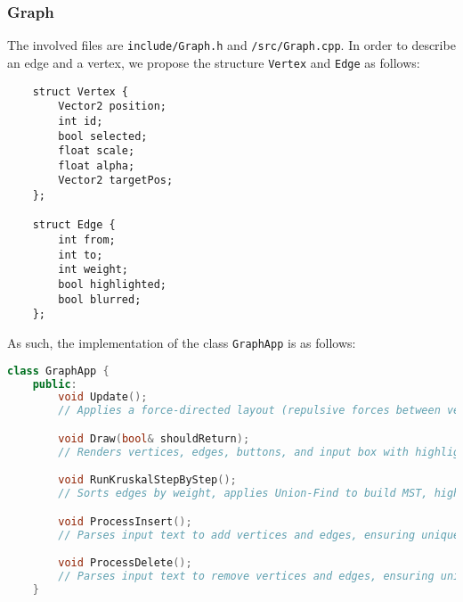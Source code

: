 \documentclass{article}
\begin{document}
\subsubsection{Graph}
The involved files are \lstinline|include/Graph.h| and \lstinline|/src/Graph.cpp|. In order to describe an edge and a vertex, we propose the structure \lstinline|Vertex| and \lstinline|Edge| as follows:
\begin{lstlisting}
	struct Vertex {
		Vector2 position;
		int id;
		bool selected;
		float scale;
		float alpha;
		Vector2 targetPos;
	};

	struct Edge {
		int from;
		int to;
		int weight;
		bool highlighted;
		bool blurred;
	};
\end{lstlisting}
As such, the implementation of the class \lstinline|GraphApp| is as follows:
\begin{lstlisting}[language=c++]
	class GraphApp {
	public:
		void Update();
		// Applies a force-directed layout (repulsive forces between vertices, UI avoidance) to position nodes dynamically (O(n^2)).

		void Draw(bool& shouldReturn);
		// Renders vertices, edges, buttons, and input box with highlights (O(K + E)).

		void RunKruskalStepByStep();
		// Sorts edges by weight, applies Union-Find to build MST, highlights steps over time (O(ElogE)).

		void ProcessInsert();
		// Parses input text to add vertices and edges, ensuring uniqueness (O(K + E)).

		void ProcessDelete();
		// Parses input text to remove vertices and edges, ensuring uniqueness (O(K + E)).
	}
\end{lstlisting}
\end{document}
